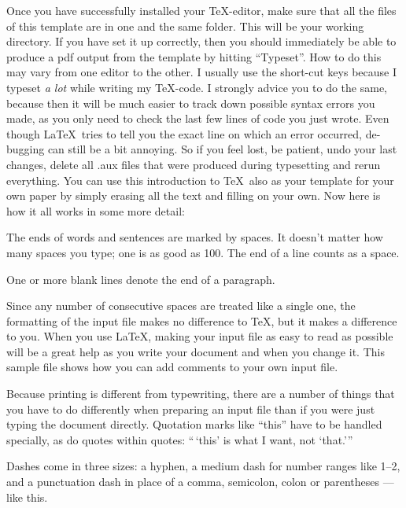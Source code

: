 \documentclass[aodsor,preprint]{imsart}
\numberwithin{equation}{section}
\theoremstyle{plain}
\begin{document}
Once you have successfully installed your \TeX-editor, make sure that all the files of this template are in one and the same folder. This will be your working directory. If you have set it up correctly, then you should immediately be able to produce a pdf output from the template by hitting ``Typeset''. How to do this may vary from one editor to the other. I usually use the short-cut keys because I typeset \emph{a lot} while writing my \TeX-code. I strongly advice you to do the same, because then it will be much easier to track down possible syntax errors you made, as you only need to check the last few lines of code you just wrote. Even though \LaTeX\ tries to tell you the exact line on which an error occurred, de-bugging can still be a bit annoying. So if you feel lost, be patient, undo your last changes, delete all .aux files that were produced during typesetting and rerun everything. You can use this introduction to \TeX\ also as your template for your own paper by simply erasing all the text and filling on your own. Now here is how it all works in some more detail:

\medskip

The ends  of words and sentences are marked
  by   spaces. It  doesn't matter how many
spaces    you type; one is as good as 100.  The
end of   a line counts as a space.

One   or more   blank lines denote the  end
of  a paragraph.

Since any number of consecutive spaces are treated like a single
one, the formatting of the input file makes no difference to
      \TeX,         %
but it makes a difference to you.
When you use
      \LaTeX,       %
making your input file as easy to read as possible
will be a great help as you write your document and when you
change it.  This sample file shows how you can add comments to
your own input file.

Because printing is different from typewriting, there are a
number of things that you have to do differently when preparing
an input file than if you were just typing the document directly.
Quotation marks like
       ``this''
have to be handled specially, as do quotes within quotes:
       ``\,`this'                  %
    is what I want,
    not  `that.'''

Dashes come in three sizes: a hyphen, %
a medium dash for number ranges like
       1--2,
and a punctuation dash in place of a comma, semicolon, colon or parentheses
       ---like
this.
\end{document}
